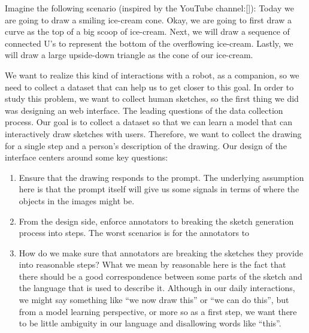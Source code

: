 
Imagine the following scenario (inspired by the YouTube channel:[]):
Today we are going to draw a smiling ice-cream cone. Okay, we are going to first draw a curve as the top of a big scoop of ice-cream. Next, we will draw a sequence of connected U's to represent the bottom of the overflowing ice-cream. Lastly, we will draw a large upside-down triangle as the cone of our ice-cream.

We want to realize this kind of interactions with a robot, as a companion, so we need to collect a dataset that can help us to get closer to this goal. In order to study this problem, we want to collect human sketches, so the first thing we did was designing an web interface.  
The leading questions of the data collection process. Our goal is to collect a dataset so that we can learn a model that can interactively draw sketches with users. Therefore, we want to collect the drawing for a single step and a person's description of the drawing. Our design of the interface centers around some key questions: 
\begin{enumerate}
    \item \label{data_design_3} Ensure that the drawing responds to the prompt. The underlying assumption here is that the prompt itself will give us some signals in terms of where the objects in the images might be.  
    \item \label{data_design_1} From the design side, enforce annotators to breaking the sketch generation process into steps. The worst scenarios is for the annotators to   
    \item \label{data_design_2} How do we make sure that annotators are breaking the sketches they provide into reasonable steps? What we mean by reasonable here is the fact that there should be a good correspondence between some parts of the sketch and the language that is used to describe it. Although in our daily interactions, we might say something like ``we now draw this'' or ``we can do this'', but from a model learning perspective, or more so as a first step, we want there to be little ambiguity in our language and disallowing words like ``this''.     
\end{enumerate}



